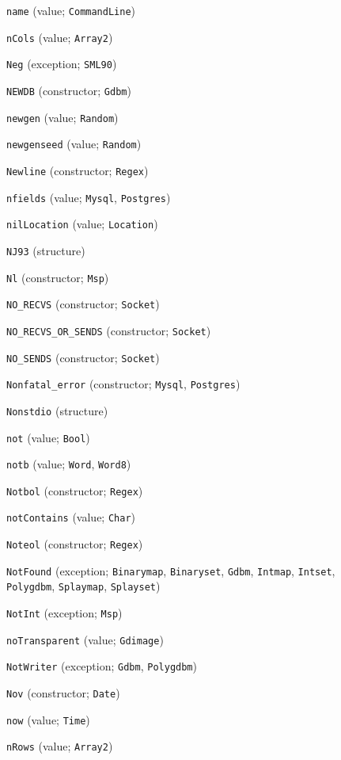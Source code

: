 \begin{description}
\item[] \verb"name" (value; \verb"CommandLine")
\item[] \verb"nCols" (value; \verb"Array2")
\item[] \verb"Neg" (exception; \verb"SML90")
\item[] \verb"NEWDB" (constructor; \verb"Gdbm")
\item[] \verb"newgen" (value; \verb"Random")
\item[] \verb"newgenseed" (value; \verb"Random")
\item[] \verb"Newline" (constructor; \verb"Regex")
\item[] \verb"nfields" (value; \verb"Mysql", \verb"Postgres")
\item[] \verb"nilLocation" (value; \verb"Location")
\item[] \verb"NJ93" (structure)
\item[] \verb"Nl" (constructor; \verb"Msp")
\item[] \verb"NO_RECVS" (constructor; \verb"Socket")
\item[] \verb"NO_RECVS_OR_SENDS" (constructor; \verb"Socket")
\item[] \verb"NO_SENDS" (constructor; \verb"Socket")
\item[] \verb"Nonfatal_error" (constructor; \verb"Mysql", \verb"Postgres")
\item[] \verb"Nonstdio" (structure)
\item[] \verb"not" (value; \verb"Bool")
\item[] \verb"notb" (value; \verb"Word", \verb"Word8")
\item[] \verb"Notbol" (constructor; \verb"Regex")
\item[] \verb"notContains" (value; \verb"Char")
\item[] \verb"Noteol" (constructor; \verb"Regex")
\item[] \verb"NotFound" (exception; \verb"Binarymap", \verb"Binaryset", \verb"Gdbm", \verb"Intmap", \verb"Intset", \verb"Polygdbm", \verb"Splaymap", \verb"Splayset")
\item[] \verb"NotInt" (exception; \verb"Msp")
\item[] \verb"noTransparent" (value; \verb"Gdimage")
\item[] \verb"NotWriter" (exception; \verb"Gdbm", \verb"Polygdbm")
\item[] \verb"Nov" (constructor; \verb"Date")
\item[] \verb"now" (value; \verb"Time")
\item[] \verb"nRows" (value; \verb"Array2")

\end{description}
